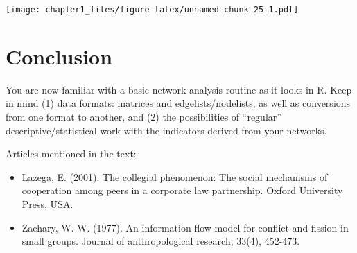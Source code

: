 \documentclass[
]{book}
\newenvironment{Shaded}{\begin{snugshade}}{\end{snugshade}}
\newcommand{\AttributeTok}[1]{\textcolor[rgb]{0.13,0.29,0.53}{#1}}
\newcommand{\FunctionTok}[1]{\textcolor[rgb]{0.13,0.29,0.53}{\textbf{#1}}}
\newcommand{\NormalTok}[1]{#1}
\newcommand{\SpecialCharTok}[1]{\textcolor[rgb]{0.81,0.36,0.00}{\textbf{#1}}}
\newcommand{\StringTok}[1]{\textcolor[rgb]{0.31,0.60,0.02}{#1}}
\begin{document}
\begin{Shaded}
\end{Shaded}

\texttt{[image: chapter1\_files/figure-latex/unnamed-chunk-25-1.pdf]}

\section*{\texorpdfstring{\textbf{Conclusion}}{Conclusion}}\label{conclusion}

You are now familiar with a basic network analysis routine as it looks in R. Keep in mind (1) data formats: matrices and edgelists/nodelists, as well as conversions from one format to another, and (2) the possibilities of ``regular'' descriptive/statistical work with the indicators derived from your networks.

Articles mentioned in the text:

\begin{itemize}
\item
  Lazega, E. (2001). The collegial phenomenon: The social mechanisms of cooperation among peers in a corporate law partnership. Oxford University Press, USA.
\item
  Zachary, W. W. (1977). An information flow model for conflict and fission in small groups. Journal of anthropological research, 33(4), 452-473.
\end{itemize}
\end{document}
